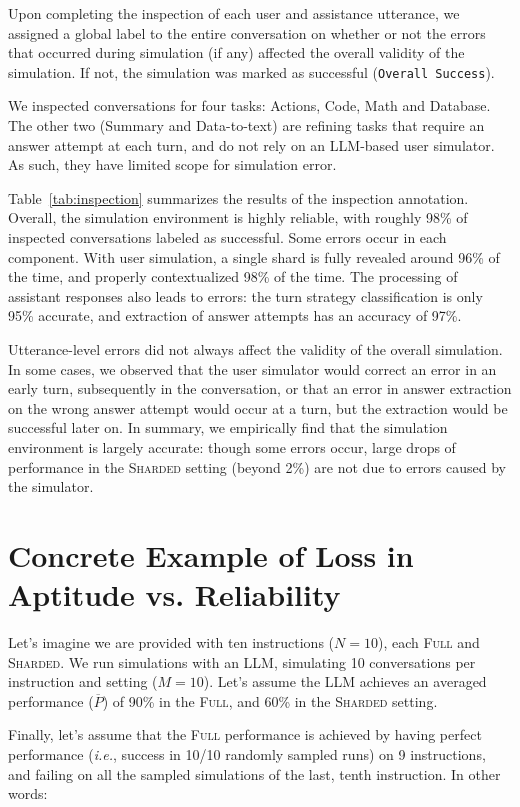 \documentclass{article}
\newcommand{\fullt}{\textsc{Full}\xspace}
\newcommand{\shardedt}{\textsc{Sharded}\xspace}
\begin{document}
\begin{appendices}
Upon completing the inspection of each user and assistance utterance, we assigned a global label to the entire conversation on whether or not the errors that occurred during simulation (if any) affected the overall validity of the simulation. If not, the simulation was marked as successful (\texttt{Overall Success}).

We inspected conversations for four tasks: Actions, Code, Math and Database. The other two (Summary and Data-to-text) are refining tasks that require an answer attempt at each turn, and do not rely on an LLM-based user simulator. As such, they have limited scope for simulation error.

Table~\ref{tab:inspection} summarizes the results of the inspection annotation. Overall, the simulation environment is highly reliable, with roughly 98\% of inspected conversations labeled as successful. Some errors occur in each component. With user simulation, a single shard is fully revealed around 96\% of the time, and properly contextualized 98\% of the time. The processing of assistant responses also leads to errors: the turn strategy classification is only 95\% accurate, and extraction of answer attempts has an accuracy of 97\%.

Utterance-level errors did not always affect the validity of the overall simulation. In some cases, we observed that the user simulator would correct an error in an early turn, subsequently in the conversation, or that an error in answer extraction on the wrong answer attempt would occur at a turn, but the extraction would be successful later on.
In summary, we empirically find that the simulation environment is largely accurate: though some errors occur, large drops of performance in the \shardedt setting (beyond 2\%) are not due to errors caused by the simulator.

\section{Concrete Example of Loss in Aptitude vs. Reliability} \label{app:concrete_a_vs_r}

Let's imagine we are provided with ten instructions ($N=10$), each \fullt and \shardedt. We run simulations with an LLM, simulating 10 conversations per instruction and setting ($M=10$). Let's assume the LLM achieves an averaged performance ($\overline{P}$) of 90\% in the \fullt, and 60\% in the \shardedt setting.

Finally, let's assume that the \fullt performance is achieved by having perfect performance (\textit{i.e.}, success in 10/10 randomly sampled runs) on 9 instructions, and failing on all the sampled simulations of the last, tenth instruction. In other words:


\end{appendices}
\end{document}
